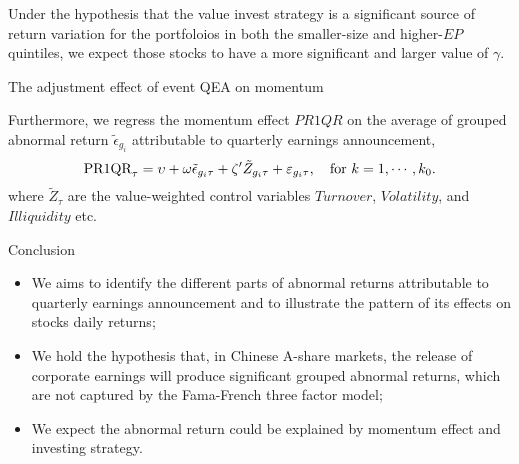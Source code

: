 \documentclass[
11pt,
ignorenonframetext,
]{beamer}
\begin{document}
\begin{frame}{}
\protect\hypertarget{section-2}{}

Under the hypothesis that the value invest strategy is a significant
source of return variation for the portfoloios in both the smaller-size
and higher-\(EP\) quintiles, we expect those stocks to have a more
significant and larger value of \(\gamma\).

\end{frame}

\begin{frame}{The adjustment effect of event QEA on momentum}
\protect\hypertarget{the-adjustment-effect-of-event-qea-on-momentum}{}

Furthermore, we regress the momentum effect \(PR1QR\) on the average of
grouped abnormal return \(\tilde \epsilon_{g_i}\) attributable to
quarterly earnings announcement, \begin{equation}
\text{PR1QR}_{\tau} = \upsilon +
\omega \tilde\epsilon_{g_i\tau} + \zeta^{\prime} \tilde Z_{g_i\tau} + \varepsilon_{g_i\tau},
\quad {\rm for} \ k=1,\cdots,k_0.
\end{equation} where \(\tilde Z_{\tau}\) are the value-weighted control
variables \(Turnover\), \(Volatility\), and \(Illiquidity\) etc.

\end{frame}

\begin{frame}{Conclusion}
\protect\hypertarget{conclusion}{}

\begin{itemize}
\item
  We aims to identify the different parts of abnormal returns
  attributable to quarterly earnings announcement and to illustrate the
  pattern of its effects on stocks daily returns;
\item
  We hold the hypothesis that, in Chinese A-share markets, the release
  of corporate earnings will produce significant grouped abnormal
  returns, which are not captured by the Fama-French three factor model;
\item
  We expect the abnormal return could be explained by momentum effect
  and investing strategy.
\end{itemize}

\end{frame}
\end{document}
